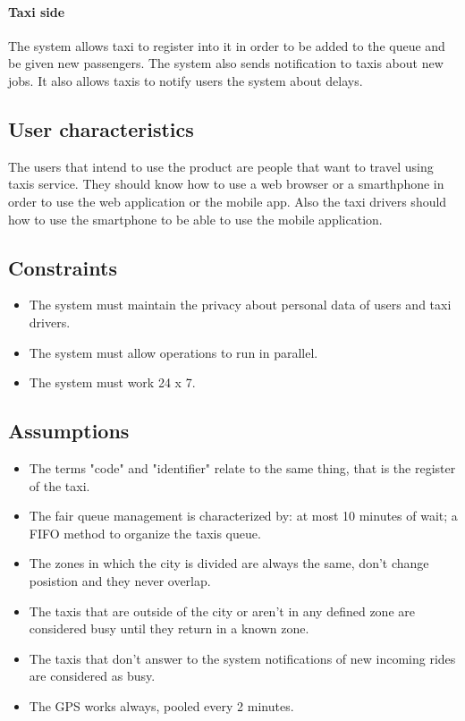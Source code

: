 		\paragraph{Taxi side}The system allows taxi to register into it in order to be added to the queue and be given new passengers. The system also sends notification to taxis about new jobs. It also allows taxis to notify users the system about delays.
	\subsection{User characteristics}
    The users that intend to use the product are people that want to travel using taxis service. They should know how to use a web browser or a smarthphone in order to use the web application or the mobile app. 
    Also the taxi drivers should how to use the smartphone to be able to use the mobile application.
	\subsection{Constraints}
	    \begin{itemize}
	    \item The system must maintain the privacy about personal data of users and taxi drivers.
	    \item The system must allow operations to run in parallel.
	    \item The system must work 24 x 7.
	    \end{itemize}
	\subsection{Assumptions}
	    \begin{itemize}
	    \item The terms "code" and "identifier" relate to the same thing, that is the register of the taxi.
	    \item The fair queue management is characterized by: at most 10 minutes of wait; a FIFO method to organize the taxis queue.
	    \item The zones in which the city is divided are always the same, don't change posistion and they never overlap.
	    \item The taxis that are outside of the city or aren't in any defined zone are considered busy until they return in a known zone.
	    \item The taxis that don't answer to the system notifications of new incoming rides are considered as busy.
	    \item The GPS works always, pooled every 2 minutes.
	    \end{itemize}